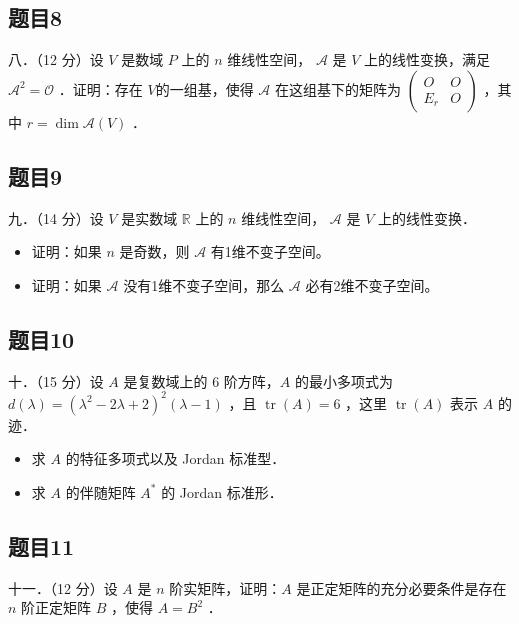 \documentclass{article}
\begin{document}
\subsection{题目8}
八．（12 分）设 \(V\) 是数域 \(P\) 上的 \(n\) 维线性空间， \(\mathcal{A}\) 是 \(V\) 上的线性变换，满足 \(\mathcal{A}^{2}=\mathcal{O}\) ．证明：存在 \(V\)的一组基，使得 \(\mathcal{A}\) 在这组基下的矩阵为 \(\left(\begin{array}{cc}O & O \\ E_{r} & O\end{array}\right)\) ，其中 \(r=\operatorname{dim} \mathcal{A}(V)\) ．

\subsection{题目9}
九．（14 分）设 \(V\) 是实数域 \(\mathbb{R}\) 上的 \(n\) 维线性空间， \(\mathcal{A}\) 是 \(V\) 上的线性变换．

\begin{itemize}
  \item[（1）] 证明：如果 \(n\) 是奇数，则 \(\mathcal{A}\) 有1维不变子空间。
  \item[（2）] 证明：如果 \(\mathcal{A}\) 没有1维不变子空间，那么 \(\mathcal{A}\) 必有2维不变子空间。
\end{itemize}

\subsection{题目10}
十．（15 分）设 \(A\) 是复数域上的 6 阶方阵，\(A\) 的最小多项式为 \(d(\lambda)=\left(\lambda^{2}-2 \lambda+2\right)^{2}(\lambda-1)\) ，且 \(\operatorname{tr}(A)=6\) ，这里 \(\operatorname{tr}(A)\) 表示 \(A\) 的迹．

\begin{itemize}
  \item[（1）] 求 \(A\) 的特征多项式以及 Jordan 标准型．
  \item[（2）] 求 \(A\) 的伴随矩阵 \(A^{*}\) 的 Jordan 标准形．
\end{itemize}

\subsection{题目11}
十一．（12 分）设 \(A\) 是 \(n\) 阶实矩阵，证明：\(A\) 是正定矩阵的充分必要条件是存在 \(n\) 阶正定矩阵 \(B\) ，使得 \(A=B^{2}\) ．
\end{document}
